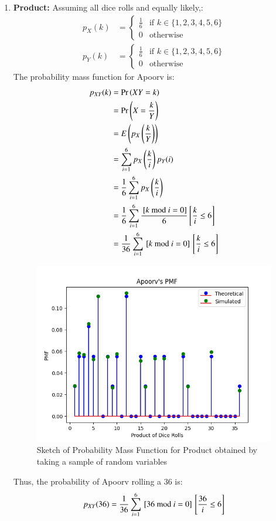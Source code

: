\documentclass[journal,12pt,twocolumn]{IEEEtran}
\theoremstyle{remark}
\begin{document}
\begin{enumerate}
\item \textbf{Product:} Assuming all dice rolls and equally likely,:
    \begin{align}
        p_X(k) &= 
        \begin{cases}
            \frac{1}{6} & \text{if }k \in \{1, 2, 3, 4, 5, 6\}\\
            0 & \text{otherwise}
        \end{cases}\label{eq:1}\\
        p_Y(k) &=
        \begin{cases}
            \frac{1}{6} & \text{if }k \in \{1, 2, 3, 4, 5, 6\}\\
            0 & \text{otherwise}
        \end{cases}
    \end{align}
    The probability mass function for Apoorv is:
    \begin{align}
        p_{XY}(k) &= \Pr\left(XY = k\right)\\
        &= \Pr\left(X = \frac{k}{Y}\right)\\
        &= E\left(p_X\left(\frac{k}{Y}\right)\right)\\
        &= \sum_{i = 1}^{6} p_X\left(\frac{k}{i}\right) p_Y(i)\\
        &= \frac{1}{6} \sum_{i = 1}^{6} p_X\left(\frac{k}{i}\right)\\
        &= \frac{1}{6} \sum_{i = 1}^{6} \frac{{}\left[k \text{ mod } i = 0\right]}{6}{}\left[\frac{k}{i} \leq 6\right]\\
        &= \frac{1}{36} \sum_{i = 1}^{6} {}\left[k \text{ mod } i = 0\right]{}\left[\frac{k}{i} \leq 6\right]
    \end{align}
    \begin{figure}[h!]
        \includegraphics[width=0.4\columnwidth]{exemplar/10/13/2/7/plots/Apoorv_PMF.png}
        \caption{Sketch of Probability Mass Function for Product obtained by taking a sample of random variables}
    \end{figure}
    Thus, the probability of Apoorv rolling a 36 is:
    \begin{align}
        p_{XY}(36) &= \frac{1}{36} \sum_{i = 1}^{6} \sbrak{36 \text{ mod } i = 0}\sbrak{\frac{36}{i} \leq 6}\\

\end{align}
\end{enumerate}
\end{document}
